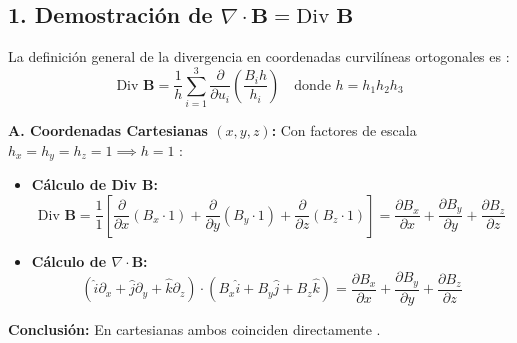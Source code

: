 \documentclass[a4paper]{article}
\begin{document}
\subsection*{1. Demostración de $\nabla \cdot \mathbf{B} = \text{Div }\mathbf{B}$}
La definición general de la divergencia en coordenadas curvilíneas ortogonales es \cite{88, 90}:
\begin{equation}
    \text{Div }\mathbf{B} = \frac{1}{h} \sum_{i=1}^3 \frac{\partial}{\partial u_i} \left( \frac{B_i h}{h_i} \right) \quad \text{donde } h = h_1 h_2 h_3
\end{equation}

\textbf{A. Coordenadas Cartesianas $(x, y, z)$:}
Con factores de escala $h_x = h_y = h_z = 1 \implies h = 1$ \cite{82, 90}:
\begin{itemize}
    \item \textbf{Cálculo de Div $\mathbf{B}$:}
    \begin{equation}
        \text{Div }\mathbf{B} = \frac{1}{1} \left[ \frac{\partial}{\partial x}(B_x \cdot 1) + \frac{\partial}{\partial y}(B_y \cdot 1) + \frac{\partial}{\partial z}(B_z \cdot 1) \right] = \frac{\partial B_x}{\partial x} + \frac{\partial B_y}{\partial y} + \frac{\partial B_z}{\partial z}
    \end{equation}
    \item \textbf{Cálculo de $\nabla \cdot \mathbf{B}$:}
    \begin{equation}
        (\hat{i} \partial_x + \hat{j} \partial_y + \hat{k} \partial_z) \cdot (B_x \hat{i} + B_y \hat{j} + B_z \hat{k}) = \frac{\partial B_x}{\partial x} + \frac{\partial B_y}{\partial y} + \frac{\partial B_z}{\partial z}
    \end{equation}
\end{itemize}
\textbf{Conclusión:} En cartesianas ambos coinciden directamente \cite{90}.
\end{document}
